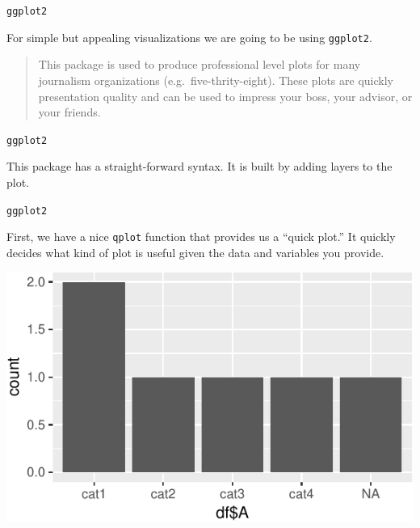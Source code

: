 \begin{frame}[fragile]{\texttt{ggplot2}}

For simple but appealing visualizations we are going to be using
\texttt{ggplot2}.

\begin{quote}
This package is used to produce professional level plots for many
journalism organizations (e.g.~five-thrity-eight). These plots are
quickly presentation quality and can be used to impress your boss, your
advisor, or your friends.
\end{quote}

\end{frame}

\begin{frame}[fragile]{\texttt{ggplot2}}

This package has a straight-forward syntax. It is built by adding layers
to the plot.

\begin{Shaded}
\begin{Highlighting}[]
\end{Highlighting}
\end{Shaded}

\end{frame}

\begin{frame}[fragile]{\texttt{ggplot2}}

First, we have a nice \texttt{qplot} function that provides us a ``quick
plot.'' It quickly decides what kind of plot is useful given the data
and variables you provide.

\begin{Shaded}
\begin{Highlighting}[]
\OperatorTok{$}
\end{Highlighting}
\end{Shaded}

\includegraphics{03_UnderstandData_files/figure-beamer/unnamed-chunk-9-1.pdf}

\end{frame}

